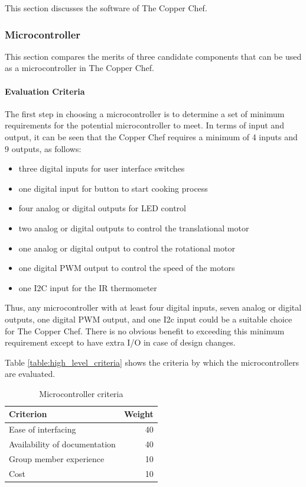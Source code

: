 \documentclass[11pt]{article}
\newcommand{\subsubsubsection}[1]{\paragraph{#1}\mbox{}}
\begin{document}
This section discusses the software of The Copper Chef.

\subsubsection{Microcontroller}

This section compares the merits of three candidate components that can be used as a microcontroller in The Copper Chef.

\subsubsubsection{Evaluation Criteria}

\noindent
The first step in choosing a microcontroller is to determine a set of minimum requirements for the potential microcontroller to meet.
In terms of input and output, it can be seen that the Copper Chef requires a minimum of 4 inputs and 9 outputs, as follows:

\begin{itemize}
  \item three digital inputs for user interface switches
  \item one digital input for button to start cooking process
  \item four analog or digital outputs for LED control
  \item two analog or digital outputs to control the translational motor
  \item one analog or digital output to control the rotational motor
  \item one digital PWM output to control the speed of the motors
  \item one I2C input for the IR thermometer
\end{itemize}

Thus, any microcontroller with at least four digital inputs, seven analog or digital outputs, one digital PWM output, and one I2c input could be a suitable choice for The Copper Chef. There is no obvious benefit to exceeding this minimum requirement except to have extra I/O in case of design changes.

Table \ref{table:high_level_criteria} shows the criteria by which the microcontrollers are evaluated.

\begin{table}[H]
\begin{tabularx}{\textwidth}{X  r}

  \hline

  Criterion & Weight \\

  \hline

  Ease of interfacing & 40 \\
  Availability of documentation & 40 \\
  Group member experience & 10 \\
  Cost & 10 \\

  \hline

\end{tabularx}
\caption{Microcontroller criteria}
\label{table:microcontroller criteria}
\end{table}
\end{document}
